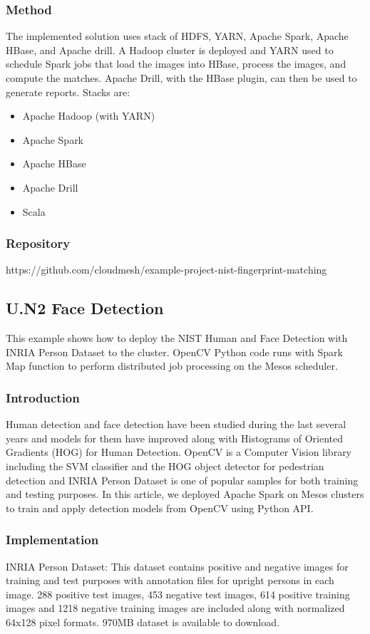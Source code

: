 \subsubsection{Method}
The implemented solution uses stack of HDFS, YARN, Apache Spark, Apache HBase,
and Apache drill. A Hadoop cluster is deployed and YARN used to schedule Spark
jobs that load the images into HBase, process the images, and compute the
matches. Apache Drill, with the HBase plugin, can then be used to generate
reports. Stacks are:

\begin{itemize}
\item Apache Hadoop (with YARN)
\item Apache Spark
\item Apache HBase
\item Apache Drill
\item Scala
\end{itemize}

\subsubsection{Repository}
https://github.com/cloudmesh/example-project-nist-fingerprint-matching

\subsection{U.N2 Face Detection}

This example shows how to deploy the NIST Human and Face Detection with INRIA
Person Dataset to the cluster. OpenCV Python code runs with Spark Map function
to perform distributed job processing on the Mesos scheduler.

\subsubsection{Introduction}
Human detection and face detection have been studied during the last several
years and models for them have improved along with Histograms of Oriented
Gradients (HOG) for Human Detection. OpenCV is a Computer Vision library
including the SVM classifier and the HOG object detector for pedestrian
detection and INRIA Person Dataset is one of popular samples for both
training and testing purposes. In this article, we deployed Apache Spark on
Mesos clusters to train and apply detection models from OpenCV using Python
API.

\subsubsection{Implementation}
INRIA Person Dataset: This dataset contains positive and negative images for
training and test purposes with annotation files for upright persons in each
image. 288 positive test images, 453 negative test images, 614 positive
training images and 1218 negative training images are included along with
normalized 64x128 pixel formats. 970MB dataset is available to download.

